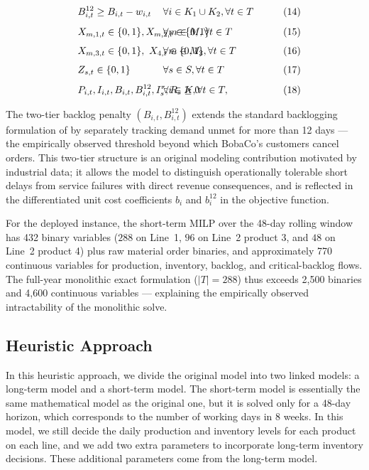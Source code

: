 \documentclass[11pt]{article}
\begin{document}
\begin{alignat}{4}
&&& B_{i,t}^{12} \geq B_{i,t}-w_{i,t}&& \hspace{-2cm} \forall i\in K_1 \cup K_2,\forall t\in T &&\tag{14}\\[4pt]
&&& X_{m,1,t}\in\{0,1\} ,X_{m,2,t}\in\{0,1\} &&\hspace{-2cm}  \forall m\in M, \forall t\in T &&\tag{15}\\[4pt]
&&& X_{m,3,t}\in\{0,1\},\ X_{4,t}\in\{0,1\} &&\hspace{-2cm} \forall m\in M_3,\forall t\in T &&\tag{16}\\[4pt]
&&& Z_{s,t}\in\{0,1\} &&\hspace{-2cm} \forall s\in S, \forall t\in T &&\tag{17}\\[4pt]
&&& P_{i,t},I_{i,t},B_{i,t},B_{i,t}^{12},I_{s}^r,R_{s}\geq 0
&& \hspace{-2cm} \forall i\in K,\forall t\in T, &&\tag{18}
\end{alignat}



The two-tier backlog penalty $(B_{i,t}, B_{i,t}^{12})$ extends the standard backlogging formulation of \cite{PochetWolsey1988} by separately tracking demand unmet for more than 12 days --- the empirically observed threshold beyond which BobaCo's customers cancel orders. This two-tier structure is an original modeling contribution motivated by industrial data; it allows the model to distinguish operationally tolerable short delays from service failures with direct revenue consequences, and is reflected in the differentiated unit cost coefficients $b_i$ and $b_i^{12}$ in the objective function.

For the deployed instance, the short-term MILP over the 48-day rolling window has 432 binary variables ($288$ on Line~1, $96$ on Line~2 product 3, and $48$ on Line~2 product 4) plus raw material order binaries, and approximately 770 continuous variables for production, inventory, backlog, and critical-backlog flows. The full-year monolithic exact formulation ($|T|=288$) thus exceeds 2{,}500 binaries and 4{,}600 continuous variables --- explaining the empirically observed intractability of the monolithic solve.


\subsection{Heuristic Approach}
\label{sec:heuristic}
In this heuristic approach, we divide the original model into two linked models: a long-term model and a short-term model. The short-term model is essentially the same mathematical model as the original one, but it is solved only for a 48-day horizon, which corresponds to the number of working days in 8 weeks. In this model, we still decide the daily production and inventory levels for each product on each line, and we add two extra parameters to incorporate long-term inventory decisions. These additional parameters come from the long-term model.
\end{document}
